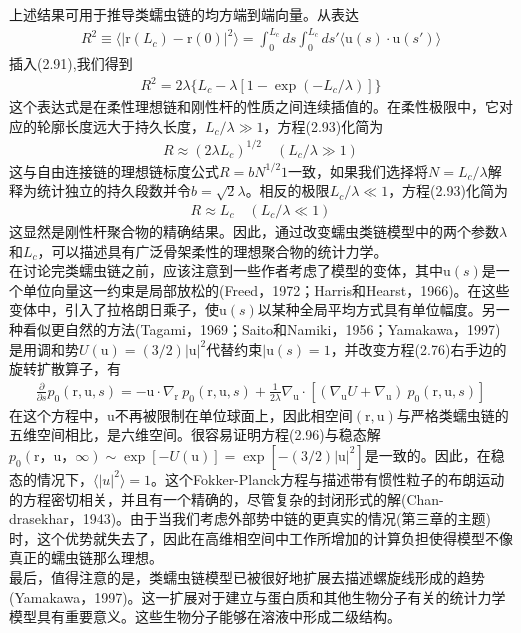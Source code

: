上述结果可用于推导类蠕虫链的均方端到端向量。从表达\\
\begin{gather}
R^2 \equiv\langle|\mathrm{r}(L_c)-\mathrm{r}(0)|^2\rangle =\int_{0}^{L_c}ds \int_{0}^{L_c}ds'\langle \mathrm{u}(s)\cdot \mathrm{u}(s')\rangle
\end{gather}
插入(2.91),我们得到\\
\begin{gather}
R^2 =2\lambda\{L_c-\lambda[1-\exp(-L_c/\lambda)]\}
\end{gather}
这个表达式是在柔性理想链和刚性杆的性质之间连续插值的。在柔性极限中，它对应的轮廓长度远大于持久长度，$L_c/\lambda \gg 1$，方程(2.93)化简为\\
\begin{gather}
R\approx(2\lambda L_c)^{1/2} \quad (L_c/\lambda \gg 1)
\end{gather}
这与自由连接链的理想链标度公式$R=bN^{1/2} 1$一致，如果我们选择将$N=L_c/\lambda$解释为统计独立的持久段数并令$b=\sqrt{2}\lambda$。相反的极限$L_c/\lambda \ll 1$，方程(2.93)化简为\\
\begin{gather}
R \approx L_c \quad (L_c/\lambda \ll 1)
\end{gather}
这显然是刚性杆聚合物的精确结果。因此，通过改变蠕虫类链模型中的两个参数$\lambda$和$L_c$，可以描述具有广泛骨架柔性的理想聚合物的统计力学。\\
在讨论完类蠕虫链之前，应该注意到一些作者考虑了模型的变体，其中$\mathrm{u}(s)$是一个单位向量这一约束是局部放松的(Freed，1972；Harris和Hearst，1966)。在这些变体中，引入了拉格朗日乘子，使$\mathrm{u}(s)$以某种全局平均方式具有单位幅度。另一种看似更自然的方法(Tagami，1969；Saito和Namiki，1956；Yamakawa，1997)是用调和势$U(\mathrm{u})=(3/2)|\mathrm{u}|^2$代替约束$|\mathrm{u}(s)=1$，并改变方程(2.76)右手边的旋转扩散算子，有\\
\begin{gather}
\frac{\partial}{\partial s}p_0(\mathrm{r},\mathrm{u},s)=-\mathrm{u}\cdot \nabla_\mathrm{r} \ p_0(\mathrm{r},\mathrm{u},s)+\frac{1}{2\lambda}\nabla_\mathrm{u}\cdot [(\nabla_\mathrm{u}U+\nabla_\mathrm{u})\ p_0(\mathrm{r},\mathrm{u},s)]
\end{gather}
在这个方程中，$\mathrm{u}$不再被限制在单位球面上，因此相空间$(\mathrm{r},\mathrm{u})$与严格类蠕虫链的五维空间相比，是六维空间。很容易证明方程(2.96)与稳态解$p_0(\mathrm{r}，\mathrm{u}，\infty)\sim \exp[−U(\mathrm{u})]=\exp[−(3/2)|\mathrm{u}|^2]$是一致的。因此，在稳态的情况下，$\langle |u|^2\rangle=1$。这个Fokker-Planck方程与描述带有惯性粒子的布朗运动的方程密切相关，并且有一个精确的，尽管复杂的封闭形式的解(Chan-drasekhar，1943)。由于当我们考虑外部势中链的更真实的情况(第三章的主题)时，这个优势就失去了，因此在高维相空间中工作所增加的计算负担使得模型不像真正的蠕虫链那么理想。\\

最后，值得注意的是，类蠕虫链模型已被很好地扩展去描述螺旋线形成的趋势(Yamakawa，1997)。这一扩展对于建立与蛋白质和其他生物分子有关的统计力学模型具有重要意义。这些生物分子能够在溶液中形成二级结构。\\
\endinput
